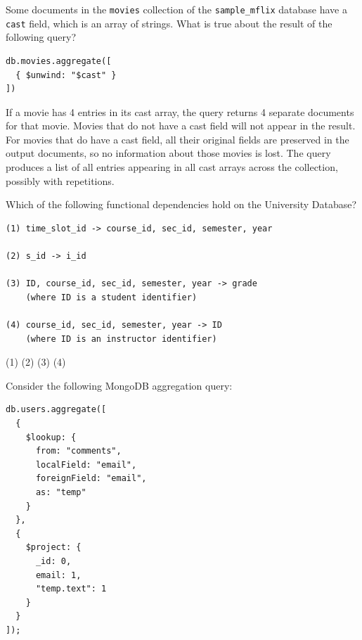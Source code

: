 \documentclass[12pt,answers]{exam}
\begin{document}
\begin{questions}
\begin{minipage}{\linewidth}
\question
Some documents in the \texttt{movies} collection of the \texttt{sample\_mflix} database have a 
\texttt{cast} field, which is an array of strings.  
What is true about the result of the following query?

\begin{verbatim}
db.movies.aggregate([
  { $unwind: "$cast" }
])
\end{verbatim}

\begin{checkboxes}
    \choice If a movie has 4 entries in its cast array, the query returns 4 separate documents for that movie.
    \choice Movies that do not have a cast field will not appear in the result.
    \choice For movies that do have a cast field, all their original fields are preserved in the output documents, so no information about those movies is lost.
    \choice The query produces a list of all entries appearing in all cast arrays across the collection, possibly with repetitions.
\end{checkboxes}
\end{minipage}

\begin{minipage}{\linewidth}
\question[4]
Which of the following functional dependencies hold on the University Database?

\begin{verbatim}
(1) time_slot_id -> course_id, sec_id, semester, year

(2) s_id -> i_id

(3) ID, course_id, sec_id, semester, year -> grade
    (where ID is a student identifier)

(4) course_id, sec_id, semester, year -> ID
    (where ID is an instructor identifier)
\end{verbatim}

\begin{checkboxes}
    \choice (1)
    \CorrectChoice (2)
    \CorrectChoice (3)
    \choice (4)
\end{checkboxes}
\end{minipage}





\begin{minipage}{\linewidth}
\question[4]
Consider the following MongoDB aggregation query:

\begin{verbatim}
db.users.aggregate([
  {
    $lookup: {
      from: "comments",
      localField: "email",
      foreignField: "email",
      as: "temp"
    }
  },
  {
    $project: {
      _id: 0,
      email: 1,
      "temp.text": 1
    }
  }
]);
\end{verbatim}


\end{minipage}
\end{questions}
\end{document}
